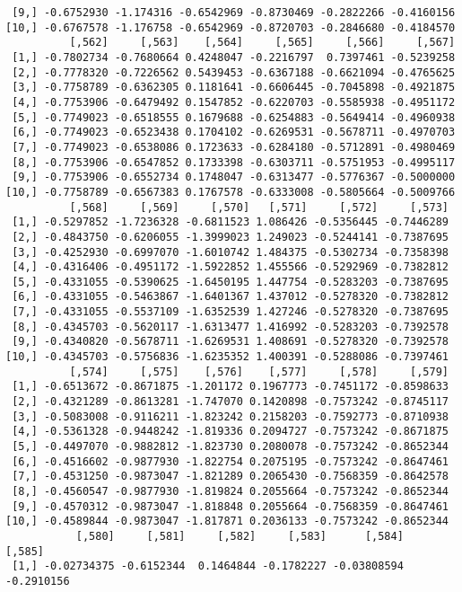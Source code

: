 \documentclass[
  letterpaper,
  DIV=11,
  numbers=noendperiod]{scrreprt}
\begin{document}
\begin{verbatim}
 [9,] -0.6752930 -1.174316 -0.6542969 -0.8730469 -0.2822266 -0.4160156
[10,] -0.6767578 -1.176758 -0.6542969 -0.8720703 -0.2846680 -0.4184570
          [,562]     [,563]    [,564]     [,565]     [,566]     [,567]
 [1,] -0.7802734 -0.7680664 0.4248047 -0.2216797  0.7397461 -0.5239258
 [2,] -0.7778320 -0.7226562 0.5439453 -0.6367188 -0.6621094 -0.4765625
 [3,] -0.7758789 -0.6362305 0.1181641 -0.6606445 -0.7045898 -0.4921875
 [4,] -0.7753906 -0.6479492 0.1547852 -0.6220703 -0.5585938 -0.4951172
 [5,] -0.7749023 -0.6518555 0.1679688 -0.6254883 -0.5649414 -0.4960938
 [6,] -0.7749023 -0.6523438 0.1704102 -0.6269531 -0.5678711 -0.4970703
 [7,] -0.7749023 -0.6538086 0.1723633 -0.6284180 -0.5712891 -0.4980469
 [8,] -0.7753906 -0.6547852 0.1733398 -0.6303711 -0.5751953 -0.4995117
 [9,] -0.7753906 -0.6552734 0.1748047 -0.6313477 -0.5776367 -0.5000000
[10,] -0.7758789 -0.6567383 0.1767578 -0.6333008 -0.5805664 -0.5009766
          [,568]     [,569]     [,570]   [,571]     [,572]     [,573]
 [1,] -0.5297852 -1.7236328 -0.6811523 1.086426 -0.5356445 -0.7446289
 [2,] -0.4843750 -0.6206055 -1.3999023 1.249023 -0.5244141 -0.7387695
 [3,] -0.4252930 -0.6997070 -1.6010742 1.484375 -0.5302734 -0.7358398
 [4,] -0.4316406 -0.4951172 -1.5922852 1.455566 -0.5292969 -0.7382812
 [5,] -0.4331055 -0.5390625 -1.6450195 1.447754 -0.5283203 -0.7387695
 [6,] -0.4331055 -0.5463867 -1.6401367 1.437012 -0.5278320 -0.7382812
 [7,] -0.4331055 -0.5537109 -1.6352539 1.427246 -0.5278320 -0.7387695
 [8,] -0.4345703 -0.5620117 -1.6313477 1.416992 -0.5283203 -0.7392578
 [9,] -0.4340820 -0.5678711 -1.6269531 1.408691 -0.5278320 -0.7392578
[10,] -0.4345703 -0.5756836 -1.6235352 1.400391 -0.5288086 -0.7397461
          [,574]     [,575]    [,576]    [,577]     [,578]     [,579]
 [1,] -0.6513672 -0.8671875 -1.201172 0.1967773 -0.7451172 -0.8598633
 [2,] -0.4321289 -0.8613281 -1.747070 0.1420898 -0.7573242 -0.8745117
 [3,] -0.5083008 -0.9116211 -1.823242 0.2158203 -0.7592773 -0.8710938
 [4,] -0.5361328 -0.9448242 -1.819336 0.2094727 -0.7573242 -0.8671875
 [5,] -0.4497070 -0.9882812 -1.823730 0.2080078 -0.7573242 -0.8652344
 [6,] -0.4516602 -0.9877930 -1.822754 0.2075195 -0.7573242 -0.8647461
 [7,] -0.4531250 -0.9873047 -1.821289 0.2065430 -0.7568359 -0.8642578
 [8,] -0.4560547 -0.9877930 -1.819824 0.2055664 -0.7573242 -0.8652344
 [9,] -0.4570312 -0.9873047 -1.818848 0.2055664 -0.7568359 -0.8647461
[10,] -0.4589844 -0.9873047 -1.817871 0.2036133 -0.7573242 -0.8652344
           [,580]     [,581]     [,582]     [,583]      [,584]     [,585]
 [1,] -0.02734375 -0.6152344  0.1464844 -0.1782227 -0.03808594 -0.2910156

\end{verbatim}
\end{document}
